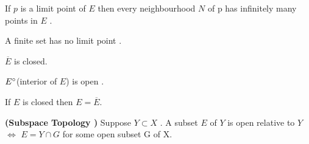 \begin{theorem}If $p$ is a limit point of $E$ then every neighbourhood $N$ of p has infinitely many points in $E$ .\end{theorem}
\begin{theorem} A finite set has no limit point .\end{theorem}
\begin{theorem} $\overline{E}$ is closed.\end{theorem}
\begin{theorem} $E \degree$(interior of $E$) is open .\end{theorem}
\begin{theorem} If $E$ is closed then $E=\overline{E}.$\end{theorem}
\begin{theorem} \textbf{(Subspace Topology ) } Suppose $Y \subset X$ 
.  A subset $E$ of $Y$ is open relative to $Y$ 
$\iff$ $E=Y\cap G$ for some open subset G of X.\end{theorem}


